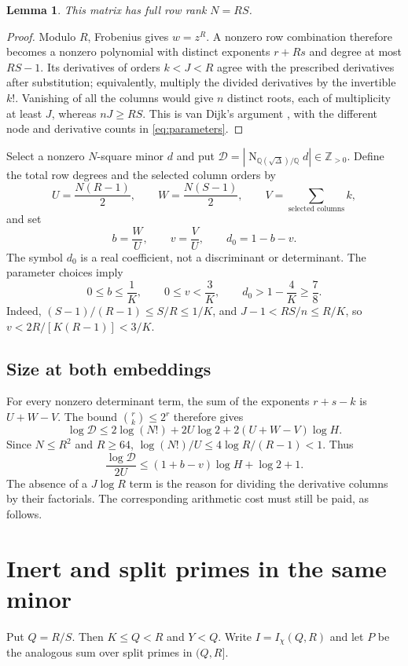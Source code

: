\documentclass[11pt]{article}
\newtheorem{lemma}[theorem]{Lemma}
\newcommand{\Z}{\mathbb Z}
\newcommand{\Q}{\mathbb Q}
\newcommand{\Nm}{\operatorname{N}}
\begin{document}
\begin{lemma}\label{lem:rank}
This matrix has full row rank $N=RS$.
\end{lemma}
\begin{proof}
Modulo $R$, Frobenius gives $w=z^R$. A nonzero row combination
therefore becomes a nonzero polynomial with distinct exponents
$r+Rs$ and degree at most $RS-1$. Its derivatives of orders
$k<J<R$ agree with the prescribed derivatives after substitution;
equivalently, multiply the divided derivatives by the invertible
$k!$. Vanishing of all the columns would give $n$ distinct roots,
each of multiplicity at least $J$, whereas $nJ\ge RS$.
This is van Dijk's argument \cite{vandijk}, with the different
node and derivative counts in \eqref{eq:parameters}.
\end{proof}

Select a nonzero $N$-square minor $d$ and put
$\mathcal D=|\Nm_{\Q(\sqrt\Delta)/\Q}d|\in\Z_{>0}$.
Define the total row degrees and the selected column orders by
\[
 U=\frac{N(R-1)}2,\qquad W=\frac{N(S-1)}2,\qquad
 V=\sum_{\text{selected columns}}k,
\]
and set
\begin{equation}\label{eq:ratios}
 b=\frac WU,\qquad v=\frac VU,\qquad d_0=1-b-v.
\end{equation}
The symbol $d_0$ is a real coefficient, not a discriminant or determinant.
The parameter choices imply
\begin{equation}\label{eq:ratio-bounds}
 0\le b\le\frac1K,\qquad 0\le v<\frac3K,\qquad
 d_0>1-\frac4K\ge\frac78.
\end{equation}
Indeed, $(S-1)/(R-1)\le S/R\le1/K$, and
$J-1<RS/n\le R/K$, so $v<2R/[K(R-1)]<3/K$.

\subsection{Size at both embeddings}
For every nonzero determinant term, the sum of the exponents
$r+s-k$ is $U+W-V$. The bound $\binom rk\le2^r$ therefore gives
\[
 \log\mathcal D\le2\log(N!)+2U\log2+2(U+W-V)\log H.
\]
Since $N\le R^2$ and $R\ge64$,
$\log(N!)/U\le4\log R/(R-1)<1$. Thus
\begin{equation}\label{eq:arch}
 \frac{\log\mathcal D}{2U}
 \le(1+b-v)\log H+\log2+1.
\end{equation}
The absence of a $J\log R$ term is the reason for dividing the
derivative columns by their factorials. The corresponding arithmetic
cost must still be paid, as follows.

\section{Inert and split primes in the same minor}
Put $Q=R/S$. Then $K\le Q<R$ and $Y<Q$.
Write $I=I_\chi(Q,R)$ and let $P$ be the analogous sum over split
primes in $(Q,R]$.
\end{document}
